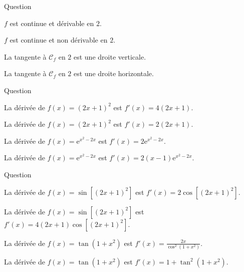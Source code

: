 \begin{multi}{Question}
    \item \(f\) est continue et dérivable en \(2\).
    \item* \(f\) est continue et non dérivable en \(2\).
    \item* La tangente à \(\mathcal{C}_f\) en \(2\) est une droite verticale.
    \item La tangente à \(\mathcal{C}_f\) en \(2\) est une droite horizontale.
\end{multi}


\begin{multi}[multiple,feedback=
{De manière plus générale, \((u^n)'=nu^{n-1}u'\) et \((\mathrm{e}^v)'=v'\mathrm{e}^v\). Il suffit de prendre \(u=2x+1\), \(n=2\) et \(v=x^2-2x\).
}]{Question}
    \item* La dérivée de \(f(x)=(2x+1)^2\) est \(f'(x)=4(2x+1)\).
    \item La dérivée de \(f(x)=(2x+1)^2\) est \(f'(x)=2(2x+1)\).
    \item La dérivée de \(f(x)=\mathrm{e}^{x^2-2x}\) est \(f'(x)=2\mathrm{e}^{x^2-2x}\).
    \item* La dérivée de \(f(x)=\mathrm{e}^{x^2-2x}\) est \(f'(x)=2(x-1)\mathrm{e}^{x^2-2x}\).
\end{multi}


\begin{multi}[multiple,feedback=
{De manière plus générale, \((\sin u)'=u'\cos u\) et 
\[(\tan v)'=\frac{v'}{\cos ^2v}=v'(1+\tan ^2v).\]
Il suffit de prendre \(u=(2x+1)^2\), \(v=1+x^2\Rightarrow u'=4(2x+1)\) et \(v'=2x\).
}]{Question}
    \item La dérivée de \(f(x)=\sin [(2x+1)^2]\) est \(f'(x)=2\cos [(2x+1)^2]\).
    \item* La dérivée de \(f(x)=\sin [(2x+1)^2]\) est \(f'(x)=4(2x+1)\cos [(2x+1)^2]\).
    \item* La dérivée de \(f(x)=\tan (1+x^2)\) est \(\displaystyle f'(x)=\frac{2x}{\cos ^2(1+x^2)}\).
    \item La dérivée de \(f(x)=\tan (1+x^2)\) est \(\displaystyle f'(x)=1+\tan ^2(1+x^2)\).
\end{multi}


